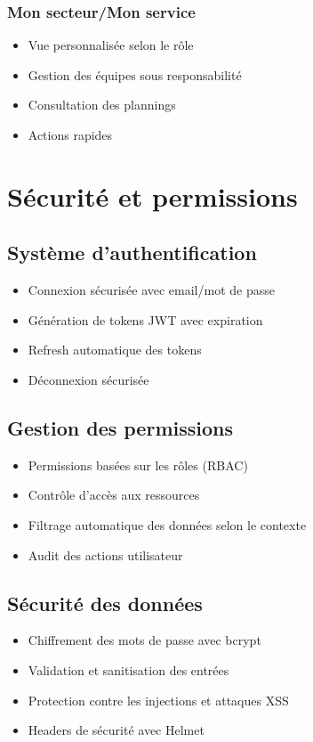 \subsubsection{Mon secteur/Mon service}
\begin{itemize}
    \item Vue personnalisée selon le rôle
    \item Gestion des équipes sous responsabilité
    \item Consultation des plannings
    \item Actions rapides
\end{itemize}

\section{Sécurité et permissions}
\subsection{Système d'authentification}
\begin{itemize}
    \item Connexion sécurisée avec email/mot de passe
    \item Génération de tokens JWT avec expiration
    \item Refresh automatique des tokens
    \item Déconnexion sécurisée
\end{itemize}

\subsection{Gestion des permissions}
\begin{itemize}
    \item Permissions basées sur les rôles (RBAC)
    \item Contrôle d'accès aux ressources
    \item Filtrage automatique des données selon le contexte
    \item Audit des actions utilisateur
\end{itemize}

\subsection{Sécurité des données}
\begin{itemize}
    \item Chiffrement des mots de passe avec bcrypt
    \item Validation et sanitisation des entrées
    \item Protection contre les injections et attaques XSS
    \item Headers de sécurité avec Helmet
\end{itemize}

